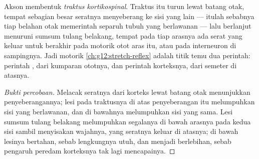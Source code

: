 \begin{proposition}\label{prop:g12:brain-and-movement:pathway}
Akson   membentuk \emph{traktus
kortikospinal}. Traktus itu turun lewat
batang otak, tempat sebagian besar seratnya menyeberang ke sisi yang
lain --- itulah sebabnya tiap belahan otak memerintah separuh tubuh
yang berlawanan --- lalu berlanjut menuruni sumsum tulang belakang,
tempat pada tiap arasnya ada serat yang keluar untuk berakhir pada
 motorik otot aras itu, atau pada interneuron di sampingnya.
Jadi  motorik \cref{ch:g12:stretch-reflex} adalah titik temu dua
perintah: perintah , dari kumparan ototnya, dan
perintah korteksnya, dari semeter di atasnya.
\end{proposition}
\begin{proof}[Bukti percobaan]
Melacak seratnya dari korteks lewat batang otak menunjukkan
penyeberangannya; lesi pada traktusnya di atas penyeberangan itu
melumpuhkan sisi yang berlawanan, dan di bawahnya melumpuhkan sisi yang
sama. Lesi sumsum tulang belakang melumpuhkan segalanya di bawah
arasnya pada kedua sisi sambil menyisakan wajahnya, yang seratnya
keluar di atasnya;  di bawah lesinya bertahan, sebab lengkungnya
utuh, dan menjadi berlebihan, sebab pengaruh peredam korteksnya tak
lagi mencapainya.
\end{proof}


